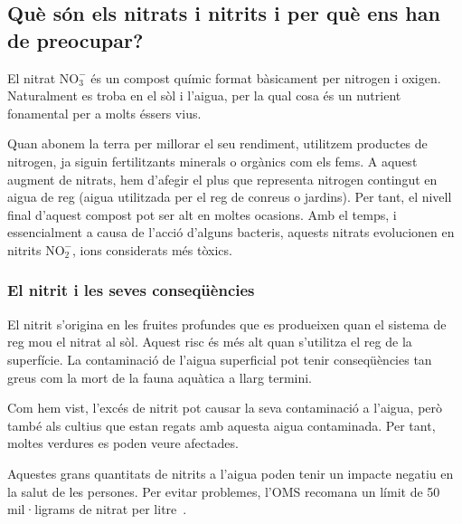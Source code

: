 \subsection{Què són els nitrats i nitrits i per què ens han de preocupar?} \label{subsec:nitratsnitrits}
El nitrat \(\mathrm{NO_3^-}\) és un compost químic format bàsicament per nitrogen i oxigen. Naturalment es troba en el sòl i l'aigua, per la qual cosa és un nutrient fonamental per a molts éssers vius.

Quan abonem la terra per millorar el seu rendiment, utilitzem productes de nitrogen, ja siguin fertilitzants minerals o orgànics com els fems. A aquest augment de nitrats, hem d'afegir el plus que representa nitrogen contingut en aigua de reg (aigua utilitzada per el reg de conreus o jardins). Per tant, el nivell final d'aquest compost pot ser alt en moltes ocasions.
Amb el temps, i essencialment a causa de l'acció d'alguns bacteris, aquests nitrats evolucionen en nitrits \(\mathrm{NO_2^-}\), ions considerats més tòxics.

\subsubsection{El nitrit i les seves conseqüències}
El nitrit s'origina en les fruites profundes que es produeixen quan el sistema de reg mou el nitrat al sòl. Aquest risc és més alt quan s'utilitza el reg de la superfície. La contaminació de l'aigua superficial pot tenir conseqüències tan greus com la mort de la fauna aquàtica a llarg termini.

Com hem vist, l'excés de nitrit pot causar la seva contaminació a l'aigua, però també als cultius que estan regats amb aquesta aigua contaminada. Per tant, moltes verdures es poden veure afectades.

Aquestes grans quantitats de nitrits a l'aigua poden tenir un impacte negatiu en la salut de les persones. Per evitar problemes, l'OMS recomana un límit de 50 mil·ligrams de nitrat per litre~\cite{Scielo}.


